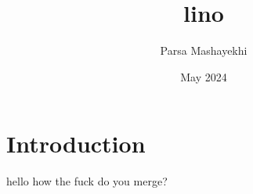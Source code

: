 \documentclass{article}
\title{lino}
\author{Parsa Mashayekhi}
\date{May 2024}
\begin{document}
\maketitle

\section{Introduction}
hello 
how the fuck do you merge?
\end{document}
